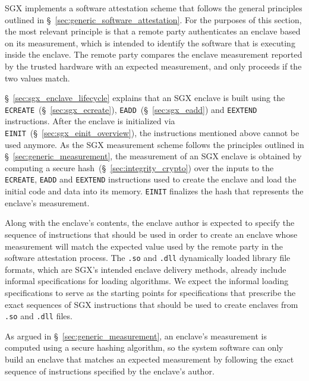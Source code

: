 \label{sec:sgx_measurement}
\label{sec:sgx_mrenclave}

SGX implements a software attestation scheme that follows the general
principles outlined in \S~\ref{sec:generic_software_attestation}. For the
purposes of this section, the most relevant principle is that a remote party
authenticates an enclave based on its measurement, which is intended to
identify the software that is executing inside the enclave. The remote party
compares the enclave measurement reported by the trusted hardware with an
expected measurement, and only proceeds if the two values match.


\S~\ref{sec:sgx_enclave_lifecycle} explains that an SGX enclave is built using
the \texttt{ECREATE}~(\S~\ref{sec:sgx_ecreate}),
\texttt{EADD}~(\S~\ref{sec:sgx_eadd}) and \texttt{EEXTEND} instructions.
After the enclave is initialized via
\texttt{EINIT}~(\S~\ref{sec:sgx_einit_overview}), the instructions mentioned
above cannot be used anymore. As the SGX measurement scheme follows the
principles outlined in \S~\ref{sec:generic_measurement}, the measurement of an
SGX enclave is obtained by computing a secure
hash~(\S~\ref{sec:integrity_crypto}) over the inputs to the \texttt{ECREATE},
\texttt{EADD} and \texttt{EEXTEND} instructions used to create the enclave and
load the initial code and data into its memory. \texttt{EINIT} finalizes the
hash that represents the enclave's measurement.

Along with the enclave's contents, the enclave author is expected to specify
the sequence of instructions that should be used in order to create an enclave
whose measurement will match the expected value used by the remote party in the
software attestation process. The \texttt{.so} and \texttt{.dll} dynamically
loaded library file formats, which are SGX's intended enclave delivery methods,
already include informal specifications for loading algorithms. We expect the
informal loading specifications to serve as the starting points for
specifications that prescribe the exact sequences of SGX instructions that
should be used to create enclaves from \texttt{.so} and \texttt{.dll} files.

As argued in \S~\ref{sec:generic_measurement}, an enclave's measurement is
computed using a secure hashing algorithm, so the system software can only
build an enclave that matches an expected measurement by following the exact
sequence of instructions specified by the enclave's author.

